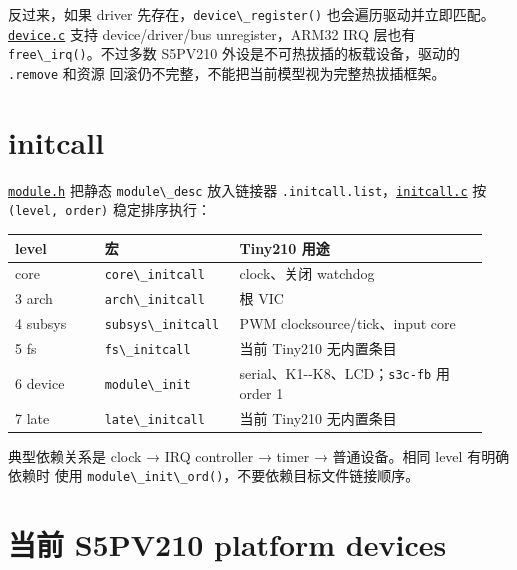 反过来，如果 driver 先存在，\passthrough{\lstinline!device\_register()!}
也会遍历驱动并立即匹配。
\href{../../../kernel/device.c}{\passthrough{\lstinline!device.c!}} 支持
device/driver/bus unregister，ARM32 IRQ 层也有
\passthrough{\lstinline!free\_irq()!}。不过多数 S5PV210
外设是不可热拔插的板载设备，驱动的 \passthrough{\lstinline!.remove!}
和资源 回滚仍不完整，不能把当前模型视为完整热拔插框架。

\section{initcall}\label{initcall}

\href{../../../kernel/module.h}{\passthrough{\lstinline!module.h!}}
把静态 \passthrough{\lstinline!module\_desc!} 放入链接器
\passthrough{\lstinline!.initcall.list!}，\href{../../../kernel/arch/arm/initcall.c}{\passthrough{\lstinline!initcall.c!}}
按 \passthrough{\lstinline!(level, order)!} 稳定排序执行：

{\def\LTcaptype{none} %
\begin{longtable}[]{@{}p{0.18\linewidth}p{0.26\linewidth}p{0.50\linewidth}@{}}
\toprule\noalign{}
level & 宏 & Tiny210 用途 \\
\midrule\noalign{}
\endhead
\bottomrule\noalign{}
\endlastfoot
1 core & \passthrough{\lstinline!core\_initcall!} & clock、关闭
watchdog \\
3 arch & \passthrough{\lstinline!arch\_initcall!} & 根 VIC \\
4 subsys & \passthrough{\lstinline!subsys\_initcall!} & PWM
clocksource/tick、input core \\
5 fs & \passthrough{\lstinline!fs\_initcall!} & 当前 Tiny210
无内置条目 \\
6 device & \passthrough{\lstinline!module\_init!} &
serial、K1-\/-K8、LCD；\passthrough{\lstinline!s3c-fb!} 用 order 1 \\
7 late & \passthrough{\lstinline!late\_initcall!} & 当前 Tiny210
无内置条目 \\
\end{longtable}
}

典型依赖关系是 clock → IRQ controller → timer → 普通设备。相同 level
有明确依赖时 使用
\passthrough{\lstinline!module\_init\_ord()!}，不要依赖目标文件链接顺序。

\section{当前 S5PV210 platform
devices}\label{ux5f53ux524d-s5pv210-platform-devices}

